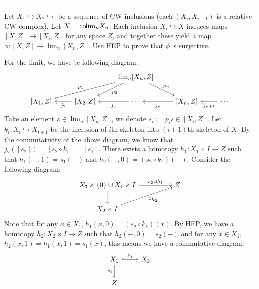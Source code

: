 \documentclass[a4paper, 12pt]{article}
\begin{document}
\noindent\rule{7in}{2.8pt}
\begin{problem}{3}
Let \(X_1\hookrightarrow X_2\hookrightarrow \) be a sequence of CW inclusions (each \((X_i,X_{i-1})\) is a relative CW complex). Let \(X=\text{colim}_n X_n\). 
Each inclusion \(X_i\hookrightarrow X\) induces maps \([X,Z]\rightarrow [X_i,Z]\) for any space \(Z\), and together these yield a map \(\phi:[X,Z]\rightarrow \lim_n[X_n,Z]\). 
Use HEP to prove that \(\phi\) is surjective.
\end{problem}
\begin{solution}
For the limit, we have te following diagram:
\[\begin{tikzcd}
	&& {\lim_n[X_n,Z]} \\
	{[X_1,Z]} & {[X_2,Z]} & \cdots & {[X_n,Z]} & \cdots
	\arrow["{p_1}"', from=1-3, to=2-1]
	\arrow["{p_2}", from=1-3, to=2-2]
	\arrow["{p_n}", from=1-3, to=2-4]
	\arrow["{j_2}", from=2-2, to=2-1]
	\arrow["{j_3}", from=2-3, to=2-2]
	\arrow["{j_n}", from=2-4, to=2-3]
	\arrow["{j_{n+1}}", from=2-5, to=2-4]
\end{tikzcd}\]
Take an element \(s\in \lim_n[X_n,Z]\), we denote \(s_i:=p_is\in [X_i,Z]\). Let \(k_i:X_i\hookrightarrow X_{i+1}\) be the inclusion of \(i\)th skeleton into \((i+1)\)th skeleton of \(X\). By the commutativity 
of the above diagram, we know that \(j_2([s_2])=[s_2\circ k_1]=[s_1]\). There exists a homotopy \(h_1:X_1\times I\rightarrow Z\) such that \(h_1(-,1)=s_1(-)\) and \(h_2(-,0)=(s_2\circ k_1)(-)\). Consider the following diagram: 
\[\begin{tikzcd}
	{X_2\times\left\{0\right\}\cup X_1\times I} && Z \\
	{X_2\times I}
	\arrow["{s_2\cup h_1}", from=1-1, to=1-3]
	\arrow[from=1-1, to=2-1]
	\arrow["{\exists h_2}"', dashed, from=2-1, to=1-3]
\end{tikzcd}\]
Note that for any \(x\in X_1\), \(h_1(x,0)=(s_2\circ k_1)(x)\). By HEP, we have a homotopy \(h_2:X_2\times I\rightarrow Z\) such that \(h_2(-,0)=s_2(-)\) and for any \(x\in X_1\), \(h_2(x,1)=h_1(x,1)=s_1(x)\), this means we have a commutative diagram: 
\[\begin{tikzcd}
	{X_1} & {X_2} \\
	Z
	\arrow["{k_1}", hook, from=1-1, to=1-2]
	\arrow["{s_1}"', from=1-1, to=2-1]

\end{tikzcd}\]
\end{solution}
\end{document}
